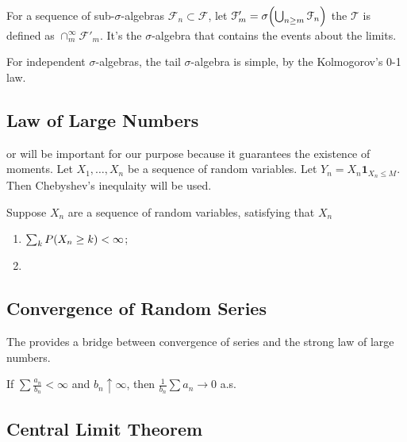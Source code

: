 For a sequence of sub-\(\sigma\)-algebras \(\mathcal{F}_{n} \subset \mathcal{F}\), let \(\mathcal{F}'_{m} = \sigma\pqty{\cup_{n\geq m} \mathcal{F}_{n}}\) the  \(\mathcal{T}\) is defined as \(\cap_{m}^{\infty} \mathcal{F}'_{m}\). It's the \(\sigma\)-algebra that contains the events about the limits. 

For independent \(\sigma\)-algebras, the tail \(\sigma\)-algebra is simple, by the Kolmogorov's 0-1 law. 

\begin{thm}
    
\end{thm}
\subsection{Law of Large Numbers}


 or  will be important for our purpose because it guarantees the existence of moments. Let \(X_{1},\dots, X_{n}\) be a sequence of random variables. Let \(Y_{n} = X_{n}\mathbf{1}_{X_{n} \leq M}\). Then Chebyshev's inequlaity will be used.

\begin{thm}
    Suppose \(X_{n}\) are a sequence of random variables, satisfying that \(X_{n}\)
    \begin{enumerate}
        \item \(\sum_{k} P \pqty{X_{n} \geq k} < \infty\);
        \item 
    \end{enumerate}
\end{thm}


\subsection{Convergence of Random Series}

The  provides a bridge between convergence of series and the strong law of large numbers. 
\begin{lemma}
    If \(\sum \frac{a_{n}}{b_{n}} < \infty\) and \(b_{n} \uparrow \infty\), then \(\frac{1}{b_{n}} \sum a_{n} \to 0\) a.s.
\end{lemma}




\subsection{Central Limit Theorem}